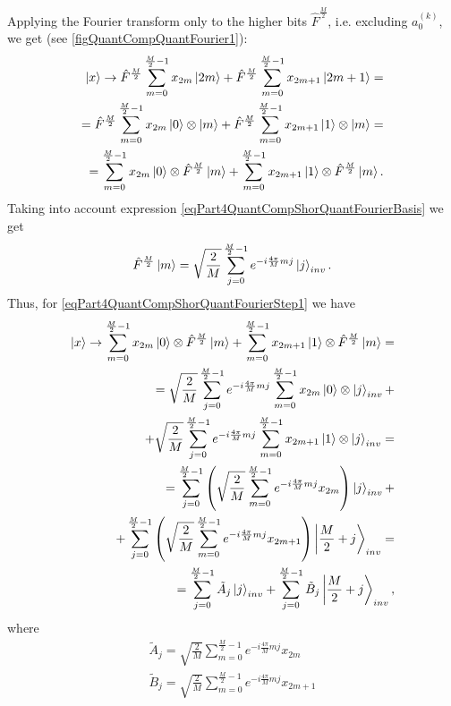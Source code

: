 Applying the Fourier transform only to the higher bits $\hat{F}^{\frac{M}{2}}$,
i.e. excluding $a^{(k)}_0$, we get (see \autoref{figQuantCompQuantFourier1}):
\begin{eqnarray}
\ket{x} \rightarrow
\hat{F}^{\frac{M}{2}} \sum_{m = 0}^{\frac{M}{2} - 1}x_{2m} \ket{2m} +
\hat{F}^{\frac{M}{2}} \sum_{m = 0}^{\frac{M}{2} - 1}x_{2m + 1}
\ket{2m+1} = 
\nonumber \\
=
\hat{F}^{\frac{M}{2}} \sum_{m = 0}^{\frac{M}{2} - 1}x_{2m} 
\ket{0} \otimes  \ket{m} +
\hat{F}^{\frac{M}{2}} \sum_{m = 0}^{\frac{M}{2} - 1}x_{2m + 1}
\ket{1} \otimes  \ket{m}
=
\nonumber \\
=
\sum_{m = 0}^{\frac{M}{2} - 1}x_{2m} 
\ket{0} \otimes \hat{F}^{\frac{M}{2}} \ket{m} +
\sum_{m = 0}^{\frac{M}{2} - 1}x_{2m + 1}
\ket{1} \otimes \hat{F}^{\frac{M}{2}} \ket{m}.
\label{eqPart4QuantCompShorQuantFourierStep1}
\end{eqnarray}
Taking into account expression \eqref{eqPart4QuantCompShorQuantFourierBasis} we get
\begin{equation}
\hat{F}^{\frac{M}{2}} \ket{m} = \sqrt{\frac{2}{M}}
\sum_{j= 0}^{\frac{M}{2} - 1} e^{-i \frac{4 \pi}{M} m j}\ket{j}_{inv}.
\nonumber
\end{equation}
Thus, for \eqref{eqPart4QuantCompShorQuantFourierStep1} we have
\begin{eqnarray}
\ket{x} \rightarrow
\sum_{m = 0}^{\frac{M}{2} - 1}x_{2m} 
\ket{0} \otimes \hat{F}^{\frac{M}{2}} \ket{m} +
\sum_{m = 0}^{\frac{M}{2} - 1}x_{2m + 1}
\ket{1} \otimes \hat{F}^{\frac{M}{2}} \ket{m} = 
\nonumber \\
=
\sqrt{\frac{2}{M}} \sum_{j = 0}^{\frac{M}{2} - 1} e^{-i \frac{4 \pi}{M} m j} 
\sum_{m = 0}^{\frac{M}{2} - 1}x_{2m} \ket{0} \otimes
\ket{j}_{inv}
+
\nonumber \\
+
\sqrt{\frac{2}{M}} \sum_{j = 0}^{\frac{M}{2} - 1} e^{-i \frac{4 \pi}{M} m j} 
\sum_{m = 0}^{\frac{M}{2} - 1}x_{2m+1} \ket{1} \otimes
\ket{j}_{inv}
=
\nonumber \\
=
\sum_{j = 0}^{\frac{M}{2} - 1}  
\left( \sqrt{\frac{2}{M}} 
\sum_{m = 0}^{\frac{M}{2} - 1} e^{-i \frac{4 \pi}{M} m j} x_{2m} 
\right) \ket{j}_{inv}
+
\nonumber \\
+
\sum_{j = 0}^{\frac{M}{2} - 1}
\left( \sqrt{\frac{2}{M}}  
\sum_{m = 0}^{\frac{M}{2} - 1}e^{-i \frac{4 \pi}{M} m j} x_{2m+1} 
\right)
\left|\frac{M}{2} + j\right>_{inv}
=
\nonumber \\
= \sum^{\frac{M}{2} - 1}_{j = 0}  \tilde{A}_{j} \ket{j}_{inv} +
\sum^{\frac{M}{2} - 1}_{j = 0}  \tilde{B}_{j} \left|\frac{M}{2} + j\right>_{inv},
\nonumber
\end{eqnarray}
where
\begin{eqnarray}
\tilde{A}_{j} = 
\sqrt{\frac{2}{M}} 
\sum_{m = 0}^{\frac{M}{2} - 1} e^{-i \frac{4 \pi}{M} m j} x_{2m} 
\nonumber \\
\tilde{B}_{j} =
\sqrt{\frac{2}{M}} 
\sum_{m = 0}^{\frac{M}{2} - 1} e^{-i \frac{4 \pi}{M} m j} x_{2m+1} 
\label{eqPart4QuantCompShorAB}
\end{eqnarray}

